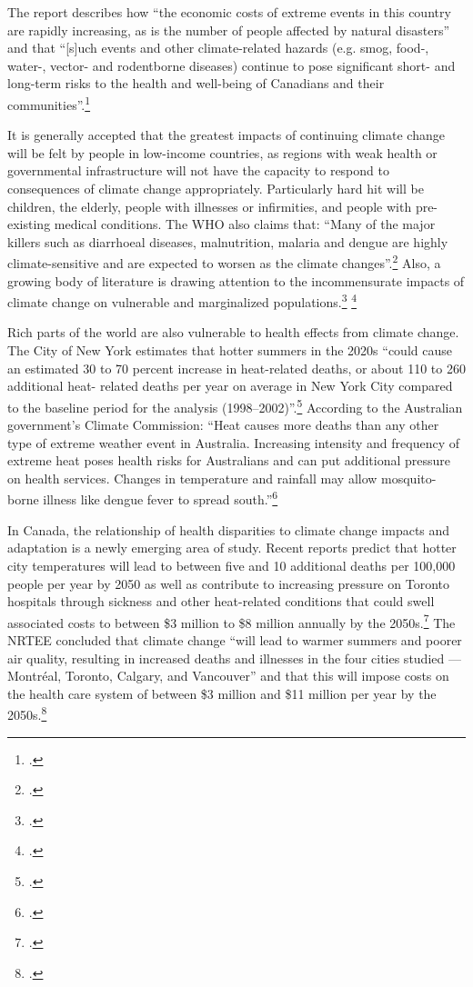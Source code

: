 The report describes how ``the economic costs of extreme events in this country are rapidly increasing, as is the number of people affected by natural disasters'' and that ``[s]uch events and other climate-related hazards (e.g. smog, food-, water-, vector- and rodentborne diseases) continue to pose significant short- and long-term risks to the health and well-being of Canadians and their communities''.\footcite[][p. 432]{HHInACC}



It is generally accepted that the greatest impacts of continuing climate change will be felt by people in low-income countries, as regions with weak health or governmental infrastructure will not have the capacity to respond to consequences of climate change appropriately. 
Particularly hard hit will be children, the elderly, people with illnesses or infirmities, and people with pre-existing medical conditions. 
The WHO also claims that: ``Many of the major killers such as diarrhoeal diseases, malnutrition, malaria and dengue are highly climate-sensitive and are expected to worsen as the climate changes''.\footcite[][]{WHOCCandHealth2012}
Also, a growing body of literature is drawing attention to the incommensurate impacts of climate change on vulnerable and marginalized populations.\footcite[][p. 1693--1733]{Costello2009} \footcite[][]{WHOSocialDeterm}



Rich parts of the world are also vulnerable to health effects from climate change.
The City of New York estimates that hotter summers in the 2020s ``could cause an estimated 30 to 70 percent increase in heat-related deaths, or about 110 to 260 additional heat- related deaths per year on average in New York City compared to the baseline period for the analysis (1998–2002)''.\footcite[][p. 31]{ResilientNewYork}
According to the Australian government's Climate Commission: ``Heat causes more deaths than any other type of extreme weather event in Australia. Increasing intensity and frequency of extreme heat poses health risks for Australians and can put additional pressure on health services. Changes in temperature and rainfall may allow mosquito-borne illness like dengue fever to spread south.''\footcite[][p. 4]{CriticalDecade2013}



In Canada, the relationship of health disparities to climate change impacts and adaptation is a newly emerging area of study. 
Recent reports predict that hotter city temperatures will lead to between five and 10 additional deaths per 100,000 people per year by 2050 as well as contribute to increasing pressure on Toronto hospitals through sickness and other heat-related conditions that could swell associated costs to between \$3 million to \$8 million annually by the 2050s.\footcite[][p. 87]{NRTEEPrice}
The NRTEE concluded that climate change ``will lead to warmer summers and poorer air quality, resulting in increased deaths and illnesses in the four cities studied — Montréal, Toronto, Calgary, and Vancouver'' and that this will impose costs on the health care system of between \$3 million and \$11 million per year by the 2050s.\footcite[][p. 16]{NRTEEPrice}



